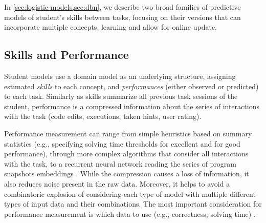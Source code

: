 In \cref{sec:logistic-models,sec:dbn}, we describe two broad
families of predictive models of student's skills between tasks,
focusing on their versions %
that can incorporate multiple concepts, learning and allow for online update. %

\subsection{Skills and Performance}

Student models use a domain model as an underlying structure,
assigning estimated \emph{skills} to each concept, %
and \emph{performances} (either observed or predicted) to each task.
Similarly as skills summarize all previous task sessions of the student,
performance is a compressed information about the series of
interactions with the task (code edits, executions, taken hints, user rating). %

Performance measurement can range from simple heuristics based on summary statistics
(e.g., specifying solving time thresholds for excellent and for good performance),
through more complex algorithms that consider all interactions with the task,
to a recurrent neural network reading the series
of program snapshots embeddings  %
\cite{student-models-deep-learning}.
While the compression causes a loss of information, it also reduces noise
present in the raw data. Moreover, it helps to avoid a combinatoric
explosion of considering each type of model with multiple different types of
input data and their combinations.
The most important consideration for performance measurement is which data to use
(e.g., correctness, solving time) \cite{alg.mastery}.

